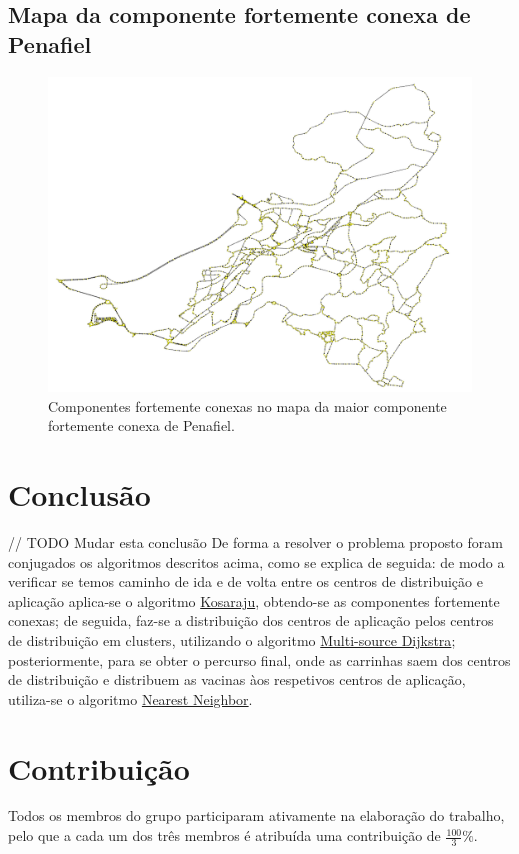 \documentclass[12pt,a4paper]{report}
\begin{document}
\section{Mapa da componente fortemente conexa de Penafiel}

\begin{figure}[H]
	\includegraphics[width=1.0\textwidth]{./imgs/scc/penafielStrongSCC.png}
	\centering
	\caption{Componentes fortemente conexas no mapa da maior componente fortemente conexa de Penafiel.}
\end{figure}



\chapter{Conclusão}

// TODO Mudar esta conclusão
De forma a resolver o problema proposto foram conjugados os algoritmos descritos acima, como se explica de seguida: 
de modo a verificar se temos caminho de ida e de volta entre os centros de distribuição e aplicação aplica-se o algoritmo \hyperref[algo:kosaraju]{Kosaraju}, 
obtendo-se as componentes fortemente conexas; de seguida, faz-se a distribuição dos centros de aplicação pelos centros de distribuição em clusters, utilizando o 
algoritmo \hyperref[algo:msdijkstra]{Multi-source Dijkstra}; posteriormente, para se obter o percurso final, onde as carrinhas saem dos centros de distribuição e distribuem
as vacinas àos respetivos centros de aplicação, utiliza-se o algoritmo \hyperref[algo:nn]{Nearest Neighbor}.


\chapter{Contribuição}
Todos os membros do grupo participaram ativamente na elaboração do trabalho, pelo que a cada um dos três membros é atribuída uma contribuição de \( \frac{100}{3} \% \).
\end{document}
